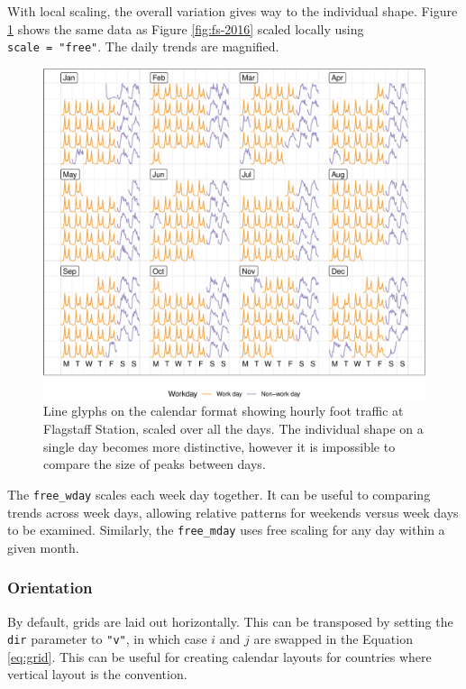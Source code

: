 \documentclass[12pt]{article}
\begin{document}
With local scaling, the overall variation gives way to the individual
shape. Figure \ref{fig:fs-free} shows the same data as Figure
\ref{fig:fs-2016} scaled locally using \texttt{scale\ =\ "free"}. The
daily trends are magnified.

\begin{figure}

{\centering \includegraphics[width=\textwidth]{figure/fs-free-1} 

}

\caption{Line glyphs on the calendar format showing hourly foot traffic at Flagstaff Station, scaled over all the days. The individual shape on a single day becomes more distinctive, however it is impossible to compare the size of peaks between days.}\label{fig:fs-free}
\end{figure}

The \texttt{free\_wday} scales each week day together. It can be useful
to comparing trends across week days, allowing relative patterns for
weekends versus week days to be examined. Similarly, the
\texttt{free\_mday} uses free scaling for any day within a given month.

\hypertarget{orientation}{%
\subsubsection{Orientation}\label{orientation}}

By default, grids are laid out horizontally. This can be transposed by
setting the \texttt{dir} parameter to \texttt{"v"}, in which case \(i\)
and \(j\) are swapped in the Equation \ref{eq:grid}. This can be useful
for creating calendar layouts for countries where vertical layout is the
convention.
\end{document}
